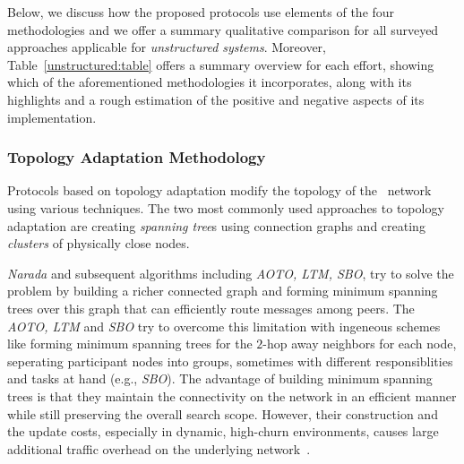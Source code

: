 Below, we discuss how the proposed protocols use elements of the four
methodologies and we offer a summary qualitative comparison for all surveyed
approaches applicable for \emph{unstructured} \p \emph{systems}.
Moreover, Table~\ref{unstructured:table} offers a summary overview for each effort,
showing which of the aforementioned methodologies it incorporates, along with its
highlights and a rough estimation of the positive and negative aspects of its
implementation.

\subsubsection{Topology Adaptation Methodology}

Protocols based on topology adaptation 
modify the topology of the \p\ network
using various techniques. The two most commonly used approaches to
topology adaptation are creating
\emph{spanning tree}s using connection graphs
and creating \emph{clusters} of physically close nodes.

\emph{Narada} and subsequent algorithms including 
\emph{AOTO, LTM, SBO}, try to solve the problem
by building a richer connected graph and forming 
minimum spanning trees over
this graph that can efficiently route messages among peers. The \emph{AOTO, LTM}
and \emph{SBO} try to
overcome this limitation with ingeneous schemes
like forming minimum spanning trees
for the $2$-hop away neighbors for each node, seperating participant nodes into
groups, sometimes with different responsiblities and tasks at hand (e.g.,
\emph{SBO}). The advantage of building minimum spanning trees is that
they maintain the connectivity on the network in
an efficient manner while still preserving the overall search scope.
However, their construction and the update costs,
especially in dynamic, high-churn environments,
causes large additional traffic overhead on the underlying
network~\cite{CRZ2000,CRSZ2001,CRSZ2002}.

